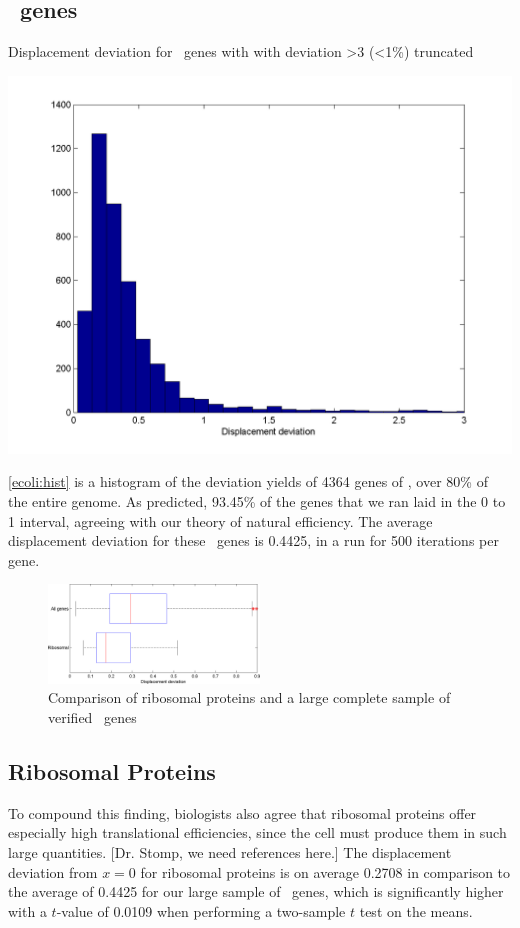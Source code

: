 \documentclass[12pt]{article}
\numberwithin{equation}{section}
\begin{document}
\subsection{\ecoli\ genes}
\begin{cfigure}
  \caption{Displacement deviation for \ecoli\ genes with with
    deviation >3 (<1\%) truncated}
  \label{ecoli:hist}
  \includegraphics[scale=0.4]{histograms/everything}
\end{cfigure}

\autoref{ecoli:hist} is a histogram of the
deviation yields of 4364 genes of \ecoli, over 80\% of the entire
genome.  As predicted, 93.45\% of the genes that we ran laid in the 0
to 1 interval, agreeing with our theory of natural efficiency.  The
average displacement deviation for these \ecoli\ genes is 0.4425, in a
run for 500 iterations per gene.

\begin{figure}
  \caption{Comparison of ribosomal proteins and a large
    complete sample of verified \ecoli\ genes}
  \label{ribosomal:comp}
  \includegraphics[width=0.5\textwidth]{histograms/ribosomal}
\end{figure}

\subsection{Ribosomal Proteins}
\label{section:riboproteins}
To compound this finding, biologists also agree that ribosomal
proteins offer especially high translational efficiencies, since the
cell must produce them in such large quantities. [Dr. Stomp, we need
  references here.] The displacement deviation from $x=0$ for ribosomal proteins
is on average 0.2708 in comparison to the average of 0.4425 for our
large sample of \ecoli\ genes, which is significantly higher with a $t$-value of
0.0109 when performing a two-sample $t$ test on the means.
\end{document}
